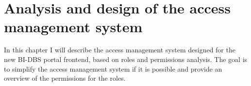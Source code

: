 \chapter{Analysis and design of the access management system} In this chapter I will describe the access management system designed for the new BI-DBS portal frontend, based on roles and permissions analysis. The goal is to simplify the access management system if it is possible and provide an overview of the permissions for the roles.







